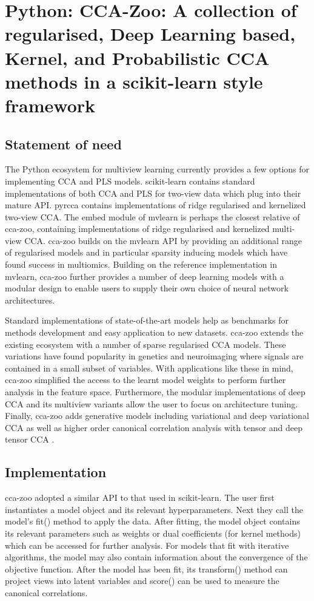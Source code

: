 \section{Python: CCA-Zoo: A collection of regularised, Deep Learning based, Kernel, and Probabilistic CCA methods in a scikit-learn style framework}\label{sec:ccazoo}

\subsection{Statement of need}
The Python ecosystem for multiview learning currently provides a few options for implementing CCA and PLS models. scikit-learn \cite{pedregosa2011scikit} contains standard implementations of both CCA and PLS for two-view data which plug into their mature API. pyrcca \cite{bilenko2016pyrcca} contains implementations of ridge regularised and kernelized two-view CCA. The embed module of mvlearn \cite{perry2020mvlearn} is perhaps the closest relative of cca-zoo, containing implementations of ridge regularised and kernelized multi-view CCA. cca-zoo builds on the mvlearn API by providing an additional range of regularised models and in particular sparsity inducing models which have found success in multiomics. Building on the reference implementation in mvlearn, cca-zoo further provides a number of deep learning models with a modular design to enable users to supply their own choice of neural network architectures.

Standard implementations of state-of-the-art models help as benchmarks for methods development and easy application to new datasets. cca-zoo extends the existing ecosystem with a number of sparse regularised CCA models. These variations have found popularity in genetics and neuroimaging where signals are contained in a small subset of variables. With applications like these in mind, cca-zoo simplified the access to the learnt model weights to perform further analysis in the feature space. Furthermore, the modular implementations of deep CCA and its multiview variants allow the user to focus on architecture tuning. Finally, cca-zoo adds generative models including variational \cite{wang2007variational} and deep variational CCA \cite{wang2016deep} as well as higher order canonical correlation analysis with tensor \cite{kim2007tensor} and deep tensor CCA \cite{wong2021deep}.

\subsection{Implementation}
cca-zoo adopted a similar API to that used in scikit-learn. The user first instantiates a model object and its relevant hyperparameters. Next they call the model's fit() method to apply the data. After fitting, the model object contains its relevant parameters such as weights or dual coefficients (for kernel methods) which can be accessed for further analysis. For models that fit with iterative algorithms, the model may also contain information about the convergence of the objective function. After the model has been fit, its transform() method can project views into latent variables and score() can be used to measure the canonical correlations.

